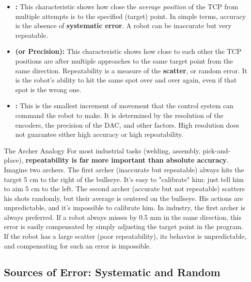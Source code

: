 \begin{itemize}
    \item \textbf{:} This characteristic shows how close the \textit{average position} of the TCP from multiple attempts is to the specified (target) point. In simple terms, accuracy is the absence of \textbf{systematic error}. A robot can be inaccurate but very repeatable.

    \item \textbf{ (or Precision):} This characteristic shows how close to each other the TCP positions are after multiple approaches to the same target point from the same direction. Repeatability is a measure of the \textbf{scatter}, or random error. It is the robot's ability to hit the same spot over and over again, even if that spot is the wrong one.

    \item \textbf{:} This is the smallest increment of movement that the control system can command the robot to make. It is determined by the resolution of the encoders, the precision of the DAC, and other factors. High resolution does not guarantee either high accuracy or high repeatability.
\end{itemize}

\begin{tipbox}{The Archer Analogy}
For most industrial tasks (welding, assembly, pick-and-place), \textbf{repeatability is far more important than absolute accuracy}. Imagine two archers.
The first archer (inaccurate but repeatable) always hits the target 5 cm to the right of the bullseye. It's easy to "calibrate" him: just tell him to aim 5 cm to the left.
The second archer (accurate but not repeatable) scatters his shots randomly, but their average is centered on the bullseye. His actions are unpredictable, and it's impossible to calibrate him.
In industry, the first archer is always preferred. If a robot always misses by 0.5 mm in the same direction, this error is easily compensated by simply adjusting the target point in the program. If the robot has a large scatter (poor repeatability), its behavior is unpredictable, and compensating for such an error is impossible.
\end{tipbox}

\subsection{Sources of Error: Systematic and Random}

